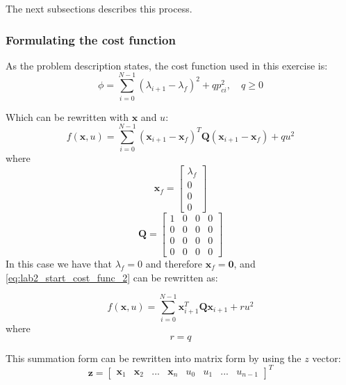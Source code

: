 \documentclass[../main.tex]{subfiles}
\begin{document}
The next subsections describes this process.

\subsubsection{Formulating the cost function} \label{sec:lab2_cost_func}
As the problem description states, the cost function used in this exercise is:
\begin{equation} \label{eq:lab2_start_cost_func}
	\phi = \sum_{i=0}^{N-1} \left( \lambda_{i+1} - \lambda_f \right)^2 + qp_{ci}^2 , \quad q \ge 0
\end{equation}

Which can be rewritten with $ \bm x $ and $ u $:
\begin{equation}\label{eq:lab2_start_cost_func_2}
	f(\bm x, u) = \sum_{i=0}^{N-1} \left( \bm x_{i+1} - \bm x_f \right)^T \bm Q \left( \bm x_{i+1} - \bm x_f \right) + q u^2
\end{equation}
where
\begin{equation}\label{eq:lab2_lambda_f}
	\bm x_f = \begin{bmatrix}
		\lambda_f \\ 0 \\ 0 \\ 0
	\end{bmatrix}
\end{equation}
\begin{equation}\label{eq:lab2_Q}
	\bm Q = \begin{bmatrix}
		1 & 0 & 0 & 0 \\
		0 & 0 & 0 & 0 \\
		0 & 0 & 0 & 0 \\
		0 & 0 & 0 & 0
	\end{bmatrix}
\end{equation}
In this case we have that $ \lambda_f = 0 $ and therefore $ \bm x_f = \bm 0 $, and \cref{eq:lab2_start_cost_func_2} can be rewritten as:

\begin{equation}\label{eq:lab2_LQR}
	f(\bm x, u) = \sum_{i=0}^{N-1} \bm x_{i+1}^T \bm Q \bm x_{i+1} + r u^2
\end{equation}
where
\begin{equation}\label{eq:lab2_R}
	r = q
\end{equation}

This summation form can be rewritten into matrix form by using the $z$ vector:
\begin{equation}\label{eq:lab2_z}
	\bm z = \begin{bmatrix}
		\bm x_1 & \bm x_2 & ... & \bm x_n & u_0 & u_1 &... & u_{n-1} 
	\end{bmatrix}^T
\end{equation}
\end{document}
